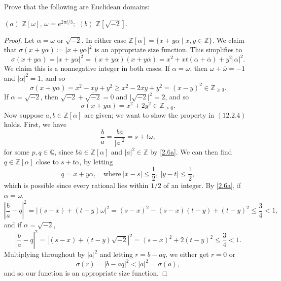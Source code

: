 \documentclass[12pt]{article}
\theoremstyle{remark}
\begin{document}
\begin{problem}\label{exc:12.2.6}
  Prove that the following are Euclidean domains:
  \par\noindent$(a)$ $\mathbb{Z}[\omega]$, $\omega=e^{2\pi i/3};$ $(b)$ $\mathbb{Z}[\sqrt{-2}]$.
\end{problem}
\begin{proof}[Proof]
  Let $\alpha = \omega$ or $\sqrt{-2}$. In either case $\mathbb{Z}[\alpha] = \{x+y\alpha \mid x,y \in \mathbb{Z}\}$. We claim that $\sigma(x+y\alpha) \coloneqq \lvert x+y\alpha\rvert^2$ is an appropriate size function. This simplifies to
  \begin{equation}\label{2.6a}
    \sigma(x+y\alpha) = \lvert x+y\alpha\rvert^2 = (x+y\alpha)(x+y\overline{\alpha}) = x^2 + xt(\alpha+\overline{\alpha}) + y^2\lvert \alpha \rvert^2.
  \end{equation}
  We claim this is a nonnegative integer in both cases. If $\alpha = \omega$, then $\omega+\overline{\omega} = -1$ and $\lvert \alpha \rvert^2 = 1$, and so
  \begin{equation*}
    \sigma(x+y\alpha) = x^2 - xy + y^2 \ge x^2 - 2xy + y^2 = (x-y)^2 \in \mathbb{Z}_{\ge0}.
  \end{equation*}
  If $\alpha = \sqrt{-2}$, then $\sqrt{-2} + \overline{\sqrt{-2}} = 0$ and $\lvert \sqrt{-2}\rvert^2 = 2$, and so
  \begin{equation*}
    \sigma(x+y\alpha) = x^2 + 2y^2 \in \mathbb{Z}_{\ge0}.
  \end{equation*}
  Now suppose $a,b \in \mathbb{Z}[\alpha]$ are given; we want to show the property in $(12.2.4)$ holds. First, we have
  \begin{equation*}
    \frac{b}{a} = \frac{b\overline{a}}{\lvert a\rvert^2} = s + t\omega,
  \end{equation*}
  for some $p,q \in \mathbb{Q}$, since $b\overline{a} \in \mathbb{Z}[\alpha]$ and $\lvert a\rvert^2 \in \mathbb{Z}$ by \eqref{2.6a}. We can then find $q \in \mathbb{Z}[\alpha]$ close to $s+t\alpha$, by letting
  \begin{equation*}
    q = x+y\alpha,\quad\text{where}~\lvert x-s\rvert \le \frac{1}{2},~\lvert y-t\rvert \le \frac{1}{2},
  \end{equation*}
  which is possible since every rational lies within $1/2$ of an integer. By \eqref{2.6a}, if $\alpha = \omega$,
  \begin{equation*}
    \left\lvert \frac{b}{a} - q \right\rvert^2 = \lvert(s-x) + (t-y)\omega\rvert^2 = (s-x)^2 - (s-x)(t-y) + (t-y)^2 \le \frac{3}{4} < 1,
  \end{equation*}
  and if $\alpha = \sqrt{-2}$,
  \begin{equation*}
    \left\lvert \frac{b}{a} - q \right\rvert^2 = \left\lvert(s-x) + (t-y)\sqrt{-2}\right\rvert^2 = (s-x)^2 + 2(t-y)^2 \le \frac{3}{4} < 1.
  \end{equation*}
  Multiplying throughout by $\lvert a\rvert^2$ and letting $r = b-aq$, we either get $r=0$ or
  \begin{equation*}
    \sigma(r) = \lvert b - aq\rvert^2 < \lvert a\rvert^2 = \sigma(a),
  \end{equation*}
  and so our function is an appropriate size function.
\end{proof}
\end{document}
